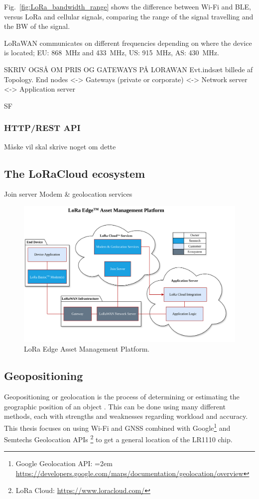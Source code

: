 Fig.~\ref{fig:LoRa_bandwidth_range} shows the difference between Wi-Fi and \ac{BLE}, versus \ac{LoRa} and cellular signals, comparing the range of the signal travelling and the \ac{BW} of the signal.

\ac{LoRaWAN} communicates on different frequencies depending on where the device is located; EU: \SI{868}{\mega\hertz} and \SI{433}{\mega\hertz}, US: \SI{915}{\mega\hertz}, AS: \SI{430}{\mega\hertz}.

SKRIV OGSÅ OM PRIS OG GATEWAYS PÅ LORAWAN
Evt.indsæt billede af Topology. End nodes <-> Gateways (private or corporate) <-> Network server <-> Application server

\ac{SF}

\subsubsection{HTTP/REST API}
Måske vil skal skrive noget om dette

\subsection{The LoRaCloud ecosystem}
Join server
Modem \& geolocation services

\begin{figure}[H]
    \centering
    \includegraphics[width=1.0\linewidth]{figures/LoRaCloud_interface.png}
    \caption{LoRa Edge Asset Management Platform.}
\end{figure}

\subsection{Geopositioning}
Geopositioning or geolocation is the process of determining or estimating the geographic position of an object \cite{ISO19130}. This can be done using many different methods, each with strengths and weaknesses regarding workload and accuracy. This thesis focuses on using Wi-Fi and \ac{GNSS} combined with Google\footnote{Google Geolocation API: \hangindent=2em \url{https://developers.google.com/maps/documentation/geolocation/overview}} and Semtechs Geolocation APIs \footnote{LoRa Cloud: \url{https://www.loracloud.com/}} to get a general location of the LR1110 chip.

